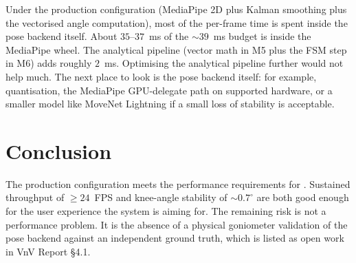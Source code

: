 \documentclass{article}
\begin{document}
Under the production configuration (MediaPipe 2D plus Kalman smoothing
plus the vectorised angle computation), most of the per-frame time is
spent inside the pose backend itself. About $35$--$37$~ms of the
$\sim 39$~ms budget is inside the MediaPipe wheel. The analytical
pipeline (vector math in M5 plus the FSM step in M6) adds roughly
$2$~ms. Optimising the analytical pipeline further would not help much.
The next place to look is the pose backend itself: for example,
quantisation, the MediaPipe GPU-delegate path on supported hardware,
or a smaller model like MoveNet Lightning if a small loss of
stability is acceptable.

\section{Conclusion}

The production configuration meets the performance requirements for
\progname{}. Sustained throughput of $\ge 24$~FPS and knee-angle
stability of $\sim 0.7^\circ$ are both good enough for the user
experience the system is aiming for. The remaining risk is not a
performance problem. It is the absence of a physical goniometer
validation of the pose backend against an independent ground truth,
which is listed as open work in VnV Report \S4.1.
\end{document}
